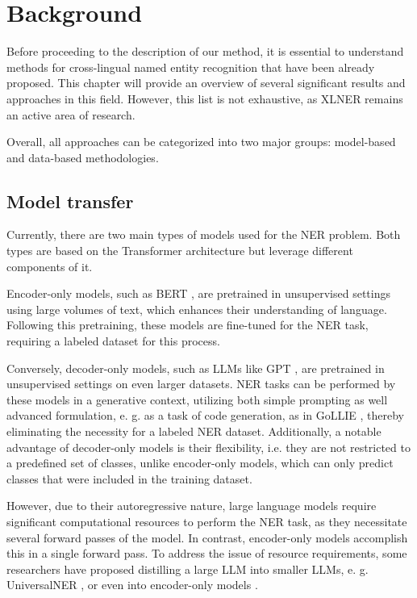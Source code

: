\chapter{Background}
\label{sec:background}
Before proceeding to the description of our method, it is essential to understand methods
for cross-lingual named entity recognition that have been already proposed. This chapter will provide
an overview of several significant results and approaches in this field. However, this list is not
exhaustive, as XLNER remains an active area of research.

Overall, all approaches can be categorized into two major groups: model-based and data-based methodologies.

\section{Model transfer}
Currently, there are two main types of models used for the  NER problem. Both types are based on the
Transformer \cite{vaswani2017attention} architecture but leverage different components of it.

Encoder-only models, such as BERT \cite{devlin-etal-2019-bert}, are pretrained in unsupervised
settings using large volumes of text, which enhances their understanding of language.
Following this pretraining, these models are fine-tuned for the NER task, requiring a labeled
dataset for this process.

Conversely, decoder-only models, such as LLMs like GPT \cite{gpt3}, are pretrained in unsupervised
settings on even larger datasets. NER tasks can be performed by these models in a generative context,
utilizing both simple prompting as well advanced formulation, e. g. as a task of code generation, as in
GoLLIE \cite{sainz2024gollieannotationguidelinesimprove}, thereby eliminating the necessity for a
labeled NER dataset. Additionally, a notable advantage of decoder-only
models is their flexibility, i.e. they are not restricted to a predefined set of classes, unlike
encoder-only models, which can only predict classes that were included in the training dataset.

However, due to their autoregressive nature, large language models require significant computational
resources to perform the NER task, as they necessitate several forward passes of the model. In contrast,
encoder-only models accomplish this in a single forward pass. To address the issue of resource
requirements, some researchers have proposed distilling a large LLM into smaller LLMs, e. g. UniversalNER \cite{zhou2023universalner},
or even into encoder-only models \cite{huang2024leveraginglargelanguagemodels}.


